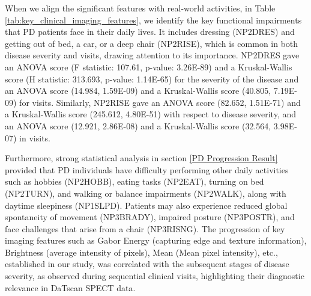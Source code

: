 \documentclass[twocolumn]{article}
\begin{document}

When we align the significant features with real-world activities, in Table \ref{tab:key_clinical_imaging_features}, we identify the key functional impairments that PD patients face in their daily lives. It includes dressing (NP2DRES) and getting out of bed, a car, or a deep chair (NP2RISE), which is common in both disease severity and visits, drawing attention to its importance. NP2DRES gave an ANOVA score (F statistic: 107.61, p-value: 3.26E-89) and a Kruskal-Wallis score (H statistic: 313.693, p-value: 1.14E-65) for the severity of the disease and an ANOVA score (14.984, 1.59E-09) and a Kruskal-Wallis score (40.805, 7.19E-09) for visits. Similarly, NP2RISE gave an ANOVA score (82.652, 1.51E-71) and a Kruskal-Wallis score (245.612, 4.80E-51) with respect to disease severity, and an ANOVA score (12.921, 2.86E-08) and a Kruskal-Wallis score (32.564, 3.98E-07) in visits. 

Furthermore, strong statistical analysis in section \ref{PD Progression Result} provided that PD individuals have difficulty performing other daily activities such as hobbies (NP2HOBB), eating tasks (NP2EAT), turning on bed (NP2TURN), and walking or balance impairments (NP2WALK), along with daytime sleepiness (NP1SLPD). Patients may also experience reduced global spontaneity of movement (NP3BRADY), impaired posture (NP3POSTR), and face challenges that arise from a chair (NP3RISNG). The progression of key imaging features such as Gabor Energy (capturing edge and texture information), Brightness (average intensity of pixels), Mean (Mean pixel intensity), etc., established in our study, was correlated with the subsequent stages of disease severity, as observed during sequential clinical visits, highlighting their diagnostic relevance in DaTscan SPECT data.
\end{document}
